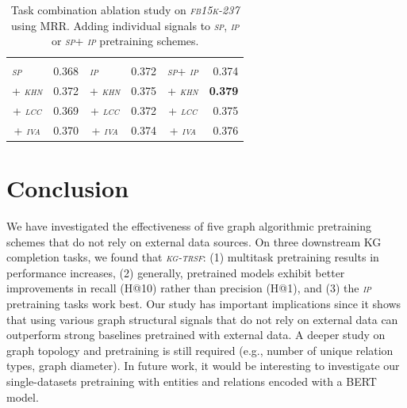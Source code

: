 \documentclass{article}
\newcommand{\kgtrsf}{\textsl{\textsc{kg-trsf}}\xspace}
\newcommand{\fb}{\textsl{\textsc{fb15k-237}}\xspace}
\newcommand{\spa}{\textsl{\textsc{sp}}\xspace}
\newcommand{\ipa}{\textsl{\textsc{ip}}\xspace}
\newcommand{\hn}{\textsl{\textsc{khn}}\xspace}
\newcommand{\lcc}{\textsl{\textsc{lcc}}\xspace}
\newcommand{\iva}{\textsl{\textsc{iva}}\xspace}
\begin{document}
\begin{table}[H]

\setlength\tabcolsep{4.5pt}
\begin{center}
\begin{tabular}{rrr|rrr|rrr}
\toprule
\rowcolor{cyan!16}\multicolumn{9}{c}{\it \textbf{Pretraining Signal Combination (MRR)}} \\
\multicolumn{2}{l|}{\spa} & 0.368 &  \multicolumn{2}{l|}{\ipa} & 0.372 &  \multicolumn{2}{l|}{\spa + \ipa} & 0.374 \\

\multicolumn{2}{c|}{+ \hn}  &  0.372 & \multicolumn{2}{c|}{+ \hn}  &  0.375 & \multicolumn{2}{c|}{+ \hn}  & \textbf{0.379} \\
\multicolumn{2}{c|}{+ \lcc} &  0.369 & \multicolumn{2}{c|}{+ \lcc} &  0.372 & \multicolumn{2}{c|}{+ \lcc} & 0.375 \\
\multicolumn{2}{c|}{+ \iva} &  0.370 & \multicolumn{2}{c|}{+ \iva} &  0.374 & \multicolumn{2}{c|}{+ \iva} & 0.376 \\

\bottomrule
\end{tabular}
\caption{\label{tab:ablation} Task combination ablation study on \fb using MRR. Adding individual signals to \spa, \ipa or \spa + \ipa pretraining schemes.}
\end{center}
\end{table}



\section{Conclusion}

We have investigated the effectiveness of five graph algorithmic pretraining schemes that do not rely on external data sources. 
On three downstream KG completion tasks, we found that \kgtrsf: 
(1) multitask pretraining results in performance increases, (2) generally, pretrained models exhibit better improvements in recall (H@10) rather than precision (H@1), and (3) the \ipa pretraining tasks work best.
Our study has important implications since it shows that using various graph structural signals that do not rely on external data can outperform strong baselines pretrained with external data.
A deeper study on graph topology and pretraining is still required (e.g., number of unique relation types, graph diameter). 
In future work, it would be interesting to investigate our single-datasets pretraining with entities and relations encoded with a BERT model.
\end{document}
